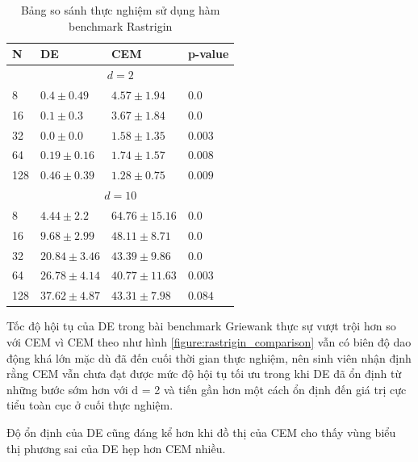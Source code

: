 \documentclass[10pt]{report}
\begin{document}
\begin{table}[H]\centering
	\caption{Bảng so sánh thực nghiệm sử dụng hàm benchmark Rastrigin}
	\begin{tabularx}{0.8\textwidth}{p{5em}XXl}
		\toprule
		\textbf{N} & \textbf{DE}                 & \textbf{CEM}        & \textbf{p-value}   \\
		\midrule
		\multicolumn{4}{c}{\(d = 2\)}                                                       \\
		\midrule
		8          & \(\mathbf{0.4 \pm 0.49}\)   & \(4.57 \pm 1.94\)   & \(\mathbf{0.0}\)   \\
		16         & \(\mathbf{0.1 \pm 0.3}\)    & \(3.67 \pm 1.84\)   & \(\mathbf{0.0}\)   \\
		32         & \(\mathbf{0.0 \pm 0.0}\)    & \(1.58 \pm 1.35\)   & \(\mathbf{0.003}\) \\
		64         & \(\mathbf{0.19 \pm 0.16}\)  & \(1.74 \pm 1.57\)   & \(\mathbf{0.008}\) \\
		128        & \(\mathbf{0.46 \pm 0.39}\)  & \(1.28 \pm 0.75\)   & \(\mathbf{0.009}\) \\
		\midrule
		\multicolumn{4}{c}{\(d = 10\)}                                                      \\
		\midrule
		8          & \(\mathbf{4.44 \pm 2.2}\)   & \(64.76 \pm 15.16\) & \(\mathbf{0.0}\)   \\
		16         & \(\mathbf{9.68 \pm 2.99}\)  & \(48.11 \pm 8.71\)  & \(\mathbf{0.0}\)   \\
		32         & \(\mathbf{20.84 \pm 3.46}\) & \(43.39 \pm 9.86\)  & \(\mathbf{0.0}\)   \\
		64         & \(\mathbf{26.78 \pm 4.14}\) & \(40.77 \pm 11.63\) & \(\mathbf{0.003}\) \\
		128        & \(\mathbf{37.62 \pm 4.87}\) & \(43.31 \pm 7.98\)  & \(0.084\)          \\
		\bottomrule
	\end{tabularx}
\end{table}

Tốc độ hội tụ của DE trong bài benchmark Griewank thực sự vượt trội hơn so với CEM vì CEM theo như hình \ref{figure:rastrigin_comparison} vẫn có biên độ dao động khá lớn mặc dù đã đến cuối thời gian thực nghiệm, nên sinh viên nhận định rằng CEM vẫn chưa đạt được mức độ hội tụ tối ưu trong khi DE đã ổn định từ những bước sớm hơn với d = 2 và tiến gần hơn một cách ổn định đến giá trị cực tiểu toàn cục ở cuối thực nghiệm.

Độ ổn định của DE cũng đáng kể hơn khi đồ thị của CEM cho thấy vùng biểu thị phương sai của DE hẹp hơn CEM nhiều.
\end{document}
